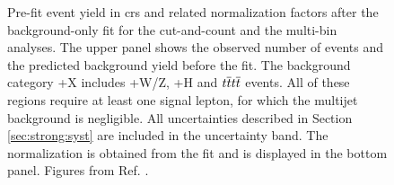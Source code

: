 \begin{figure}[htbp]
	\centering
	\caption{Pre-fit event yield in \glspl{cr} and related \ttbar
          normalization factors after the background-only fit for
		the cut-and-count and  the multi-bin analyses. The upper panel shows 
		the observed number of events and the predicted background yield before the fit.
		The background category \ttbar+X includes \ttbar+W/Z, \ttbar+H and $t\overline{t} t\overline{t}$ events. All of these
                regions require at least one signal lepton, for which the
                multijet background is negligible. All uncertainties described in Section \ref{sec:strong:syst} are included in the uncertainty band.
		The \ttbar normalization is obtained from the fit
                and is displayed in the bottom panel.  Figures from Ref. \cite{Aaboud:2017hrg}.
	} 
	\label{fig:pullCR}
\end{figure}


